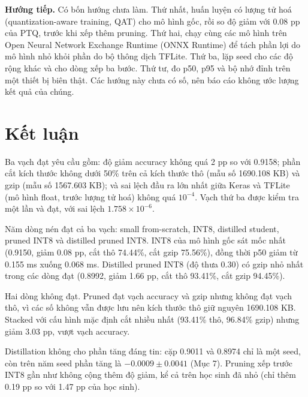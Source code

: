 \documentclass[13pt,a4paper]{article}
\begin{document}
\textbf{Hướng tiếp.} Có bốn hướng chưa làm. Thứ nhất, huấn luyện có lượng tử hoá (quantization-aware training, QAT) cho mô hình gốc, rồi so độ giảm với 0.08 pp của PTQ, trước khi xếp thêm pruning. Thứ hai, chạy cùng các mô hình trên Open Neural Network Exchange Runtime (ONNX Runtime) để tách phần lợi do mô hình nhỏ khỏi phần do bộ thông dịch TFLite. Thứ ba, lặp seed cho các độ rộng khác và cho dòng xếp ba bước. Thứ tư, đo p50, p95 và bộ nhớ đỉnh trên một thiết bị biên thật. Các hướng này chưa có số, nên báo cáo không ước lượng kết quả của chúng.

\section{Kết luận}

Ba vạch đạt yêu cầu gồm: độ giảm accuracy không quá 2 pp so với 0.9158; phần cắt kích thước không dưới 50\% trên cả kích thước thô (mẫu số 1690.108 KB) và gzip (mẫu số 1567.603 KB); và sai lệch đầu ra lớn nhất giữa Keras và TFLite (mô hình float, trước lượng tử hoá) không quá \(10^{-4}\). Vạch thứ ba được kiểm tra một lần và đạt, với sai lệch \(1.758 \times 10^{-6}\).

Năm dòng nén đạt cả ba vạch: small from-scratch, INT8, distilled student, pruned INT8 và distilled pruned INT8. INT8 của mô hình gốc sát mốc nhất (0.9150, giảm 0.08 pp, cắt thô 74.44\%, cắt gzip 75.56\%), đồng thời p50 giảm từ 0.155 ms xuống 0.068 ms. Distilled pruned INT8 (độ thưa 0.30) có gzip nhỏ nhất trong các dòng đạt (0.8992, giảm 1.66 pp, cắt thô 93.41\%, cắt gzip 94.45\%).

Hai dòng không đạt. Pruned đạt vạch accuracy và gzip nhưng không đạt vạch thô, vì các số không vẫn được lưu nên kích thước thô giữ nguyên 1690.108 KB. Stacked với cấu hình mặc định cắt nhiều nhất (93.41\% thô, 96.84\% gzip) nhưng giảm 3.03 pp, vượt vạch accuracy.

Distillation không cho phần tăng đáng tin: cặp 0.9011 và 0.8974 chỉ là một seed, còn trên năm seed phần tăng là \(-0.0009 \pm 0.0041\) (Mục 7). Pruning xếp trước INT8 gần như không cộng thêm độ giảm, kể cả trên học sinh đã nhỏ (chỉ thêm 0.19 pp so với 1.47 pp của học sinh).
\end{document}
